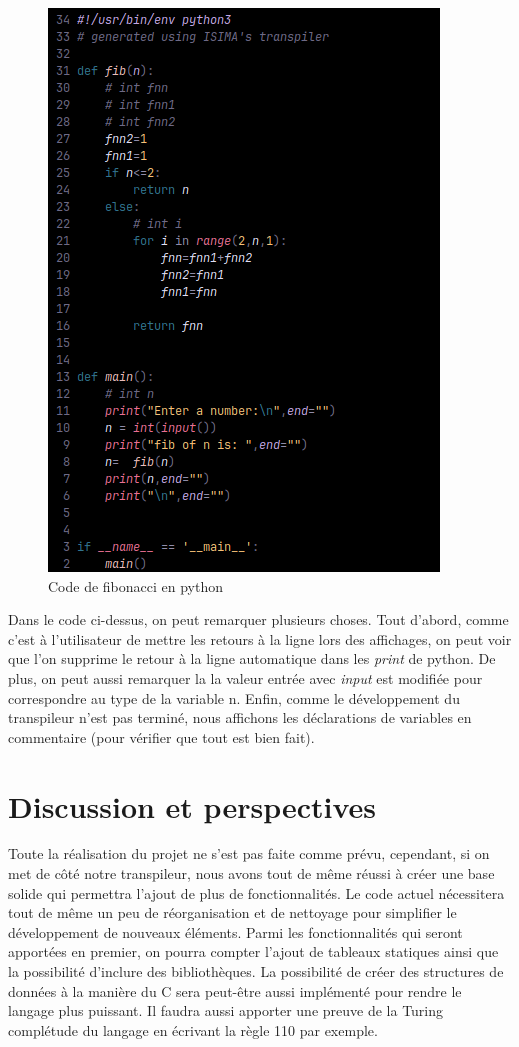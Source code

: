 \documentclass[a4paper]{article}%
\begin{document}
\begin{figure}[h]
  \begin{center}
  \includegraphics[scale=0.7]{./img/fib-prog-code.png}
  \caption{Code de fibonacci en python}
  \end{center}
\end{figure}

Dans le code ci-dessus, on peut remarquer plusieurs choses. Tout d'abord, comme
c'est à l'utilisateur de mettre les retours à la ligne lors des affichages, on
peut voir que l'on supprime le retour à la ligne automatique dans les
\textit{print} de python. De plus, on peut aussi remarquer la la valeur entrée
avec \textit{input} est modifiée pour correspondre au type de la variable n.
Enfin, comme le développement du transpileur n'est pas terminé, nous affichons
les déclarations de variables en commentaire (pour vérifier que tout est bien
fait).

\clearpage
\section{Discussion et perspectives}

Toute la réalisation du projet ne s'est pas faite comme prévu, cependant, si on
met de côté notre transpileur, nous avons tout de même réussi à créer une base
solide qui permettra l'ajout de plus de fonctionnalités. Le code actuel
nécessitera tout de même un peu de réorganisation et de nettoyage pour
simplifier le développement de nouveaux éléments. Parmi les fonctionnalités qui
seront apportées en premier, on pourra compter l'ajout de tableaux statiques
ainsi que la possibilité d'inclure des bibliothèques. La possibilité de créer
des structures de données à la manière du C sera peut-être aussi implémenté pour
rendre le langage plus puissant. Il faudra aussi apporter une preuve de la
Turing complétude du langage en écrivant la règle 110 par exemple.\\
\end{document}
